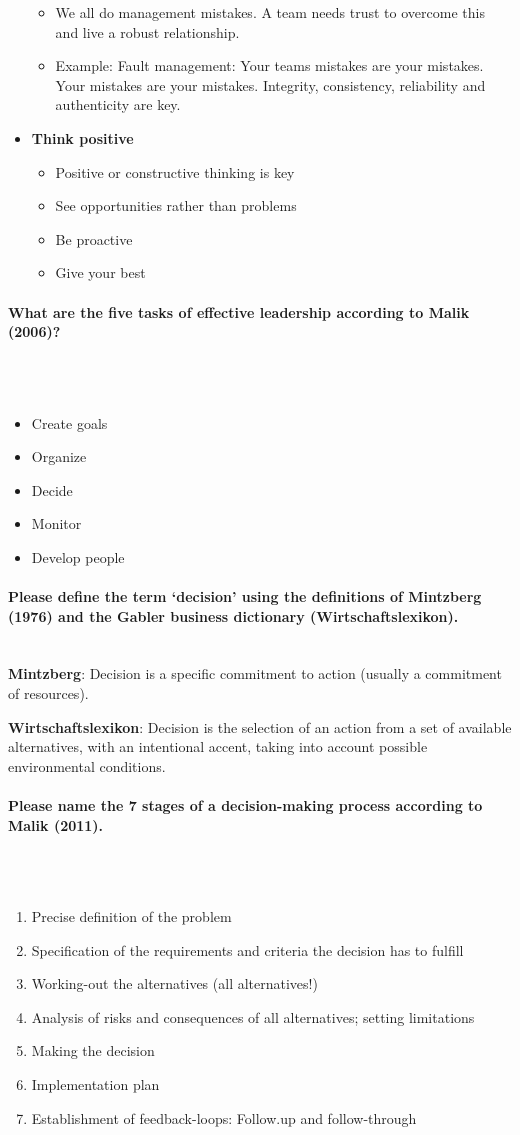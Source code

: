 \documentclass[10pt,a4paper,noendnumber=true]{scrartcl}
\newcommand{\properparagraph}[1]{\paragraph{\textcolor{Emerald}{#1}}\mbox{}\\}
\begin{document}
\begin{itemize}
		\begin{itemize}
			\item We all do management mistakes. A team needs trust to overcome this and live a robust relationship.
			\item Example: Fault management: Your teams mistakes are your mistakes. Your mistakes are your mistakes. Integrity, consistency, reliability and authenticity are key.
		\end{itemize}
		\item \textbf{Think positive}
		\begin{itemize}
			\item Positive or constructive thinking is key
			\item See opportunities rather than problems
			\item Be proactive
			\item Give your best
		\end{itemize}
\end{itemize}

\properparagraph{What are the five tasks of effective leadership according to Malik (2006)?}
\\[-6ex]
\begin{itemize}
	\item Create goals
	\item Organize
	\item Decide
	\item Monitor
	\item Develop people
\end{itemize}

\properparagraph{Please define the term ‘decision’ using the definitions of Mintzberg (1976) and the Gabler business dictionary (Wirtschaftslexikon).}
\textbf{Mintzberg}: Decision is a specific commitment to action (usually a commitment of resources).

\textbf{Wirtschaftslexikon}: Decision is the selection of an action from a set of available alternatives, with an intentional accent, taking into account possible environmental conditions.

\properparagraph{Please name the 7 stages of a decision-making process according to Malik (2011).}
\\[-6ex]
\begin{enumerate}
	\item Precise definition of the problem
	\item Specification of the requirements and criteria the decision has to fulfill
	\item Working-out the alternatives (all alternatives!)
	\item Analysis of risks and consequences of all alternatives; setting limitations
	\item Making the decision
	\item Implementation plan
	\item Establishment of feedback-loops: Follow.up and follow-through
\end{enumerate}
\end{document}
